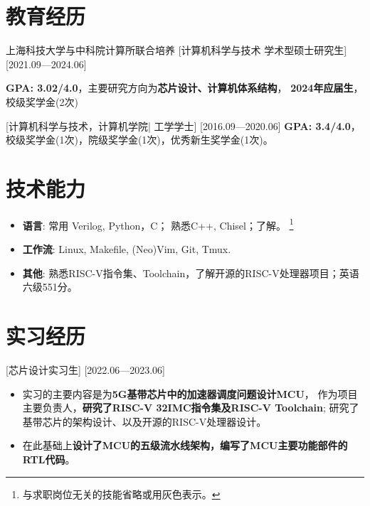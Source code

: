 \documentclass{resume}
\begin{document}

\ResumeTitle

\section{教育经历}
\ResumeItem
{上海科技大学与中科院计算所联合培养}
[\textnormal{计算机科学与技术}  学术型硕士研究生]
[2021.09—2024.06]

\textbf{GPA: 3.02/4.0}，主要研究方向为\textbf{芯片设计、计算机体系结构}，
\textbf{2024年应届生}，校级奖学金(2次)

[\textnormal{计算机科学与技术，计算机学院|} 工学学士]
[2016.09—2020.06]
\textbf{GPA: 3.4/4.0}，校级奖学金(1次)，院级奖学金(1次)，优秀新生奖学金(1次)。

\section{技术能力}
\begin{itemize}
  \item \textbf{语言}: 常用 Verilog, Python，C； 熟悉C++, Chisel；了解。
      \footnote{与求职岗位无关的技能省略或用灰色表示。}
  \item \textbf{工作流}: Linux, Makefile, (Neo)Vim, Git, Tmux.
  \item \textbf{其他}: 熟悉RISC-V指令集、Toolchain，了解开源的RISC-V处理器项目；英语六级551分。
\end{itemize}

\section{实习经历}

[芯片设计实习生]
[2022.06—2023.06] 
\begin{itemize}
    \item 实习的主要内容是为\textbf{5G基带芯片中的加速器调度问题设计MCU}，
        作为项目主要负责人，\textbf{研究了RISC-V 32IMC指令集及RISC-V Toolchain};
        研究了基带芯片的架构设计、以及开源的RISC-V处理器设计。
    \item 在此基础上\textbf{设计了MCU的五级流水线架构，编写了MCU主要功能部件的RTL代码}。
\end{itemize}
\end{document}
